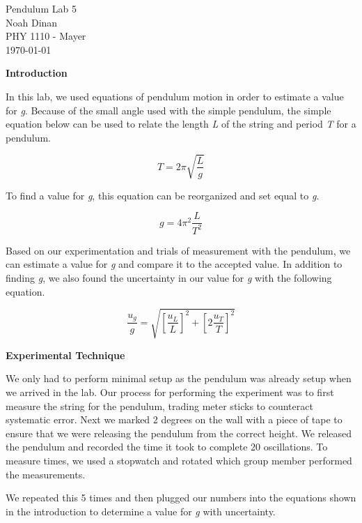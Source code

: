\documentclass[12pt]{article}
\begin{document}
\begin{center}
\vspace*{\fill}
Pendulum Lab 5 \\ Noah Dinan \\ PHY 1110 - Mayer \\ \today \\
\vspace*{\fill}
\end{center}

\newpage
{} %

\setlength{\parindent}{0in}

\textbf{Introduction}

In this lab, we used equations of pendulum motion in order to estimate a value for \textit{g}.
Because of the small angle used with the simple pendulum, the simple equation below can be used to
relate the length \textit{L} of the string and period \textit{T} for a pendulum.

\[T=2\pi \sqrt{\frac{L}{g}} \]

To find a value for \textit{g}, this equation can be reorganized and set equal to \textit{g}.

\[g = 4\pi^2 \frac{L}{T^2} \]

Based on our experimentation and trials of measurement with the pendulum,
we can estimate a value for \textit{g} and compare it to the accepted value.
In addition to finding \textit{g}, we also found the uncertainty in our value for \textit{g}
with the following equation.

\[ \frac{u_{g}}{g} = \sqrt{ [\frac {u_{L}}{L}]^2 + [2 \frac {u_{T}}{T}]^2} \]

\textbf{Experimental Technique}

We only had to perform minimal setup as the pendulum was already setup when we arrived in the lab.
Our process for performing the experiment was to first measure the string for the pendulum, trading
meter sticks to counteract systematic error. Next we marked 2 degrees on the wall with a piece of tape
to ensure that we were releasing the pendulum from the correct height. We released the pendulum and recorded the
time it took to complete 20 oscillations. To measure times, we used a stopwatch and rotated which group member 
performed the measurements.

We repeated this 5 times and then plugged our numbers into the equations
shown in the introduction to determine a value for \textit{g} with uncertainty.
\end{document}
